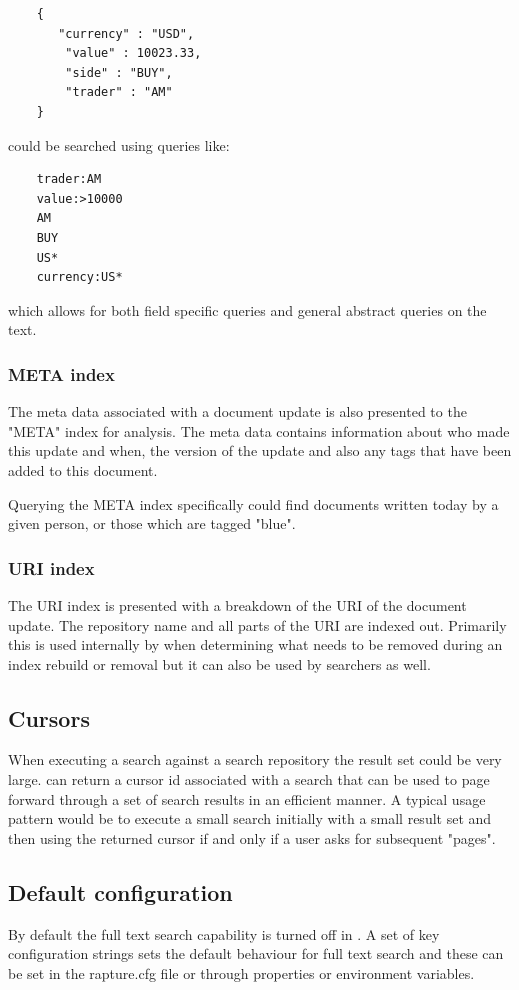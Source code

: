 \begin{Verbatim}
	{
	   "currency" : "USD",
		"value" : 10023.33,
		"side" : "BUY",
		"trader" : "AM"
	}
\end{Verbatim}

could be searched using queries like:

\begin{Verbatim}
	trader:AM
	value:>10000
	AM
	BUY
	US*
	currency:US*
\end{Verbatim}

which allows for both field specific queries and general abstract queries on the text.

\subsubsection{META index}
The meta data associated with a document update is also presented to the "META" index for analysis. The meta
data contains information about who made this update and when, the version of the update and also any tags that
have been added to this document.

Querying the META index specifically could find documents written today by a given person, or those which are tagged
"blue".

\subsubsection{URI index}
The URI index is presented with a breakdown of the URI of the document update. The repository name and all parts of the
URI are indexed out. Primarily this is used internally by \Rapture when determining what needs to be removed during an
index rebuild or removal but it can also be used by searchers as well.

\subsection{Cursors}
When executing a search against a search repository the result set could be very large. \Rapture can return a cursor id
associated with a search that can be used to page forward through a set of search results in an efficient manner. A typical
usage pattern would be to execute a small search initially with a small result set and then using the returned cursor if and
only if a user asks for subsequent "pages".

\subsection{Default configuration}
By default the full text search capability is turned off in \Rapture. A set of key configuration strings sets the default
behaviour for full text search and these can be set in the rapture.cfg file or through properties or environment variables.

